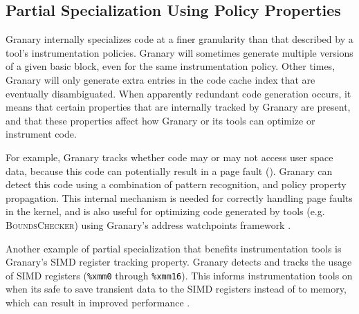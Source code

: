 \documentclass[preprint]{sigplanconf}
\newcommand{\toolname}[1]{{\scshape #1}}
\begin{document}
\subsection{Partial Specialization Using Policy Properties}

Granary internally specializes code at a finer granularity than that described by a tool's instrumentation policies. Granary will sometimes generate multiple versions of a given basic block, even for the same instrumentation policy. Other times, Granary will only generate extra entries in the code cache index that are eventually disambiguated. When apparently redundant code generation occurs, it means that certain properties that are internally tracked by Granary are present, and that these properties affect how Granary or its tools can optimize or instrument code. 

For example, Granary tracks whether code may or may not access user space data, because this code can potentially result in a page fault (). Granary can detect this code using a combination of pattern recognition, and policy property propagation. This internal mechanism is needed for correctly handling page faults in the kernel, and is also useful for optimizing code generated by tools (e.g. \toolname{BoundsChecker}) using Granary's address watchpoints framework \cite{BehaveOrBeWatched}.

Another example of partial specialization that benefits instrumentation tools is Granary's SIMD register tracking property. Granary detects and tracks the usage of SIMD registers (\texttt{\%xmm0} through \texttt{\%xmm16}). This informs instrumentation tools on when its safe to save transient data to the SIMD registers instead of to memory, which can result in improved performance \cite{Minemu}.


\end{document}
